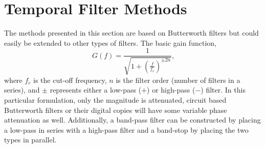 \section{Temporal Filter Methods}
The methods presented in this section are based on Butterworth filters \cite{Butterworth-1930-DvDrjKha} but could easily be extended to other types of filters.
The basic gain function,
\begin{equation}
 G(f) = \frac{1}{\sqrt{1+\left(\frac{f}{f_c}\right)^{\pm2n}}} \textrm{,}
 \label{eqn:04_butterworth}
\end{equation}
where $f_c$ is the cut-off frequency, $n$ is the filter order (number of filters in a series), and $\pm$ represents either a low-pass ($+$) or high-pass ($-$) filter.
In this particular formulation, only the magnitude is attenuated, circuit based Butterworth filters or their digital copies will have some variable phase attenuation as well.
Additionally, a band-pass filter can be constructed by placing a low-pass in series with a high-pass filter and a band-stop by placing the two types in parallel.

